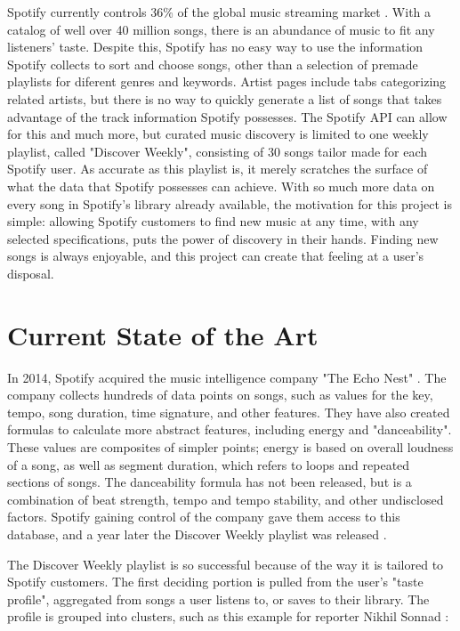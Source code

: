 Spotify currently controls 36\% of the global music streaming market \cite{Midia:18}. With a
catalog of well over 40 million songs, there is an abundance of music to fit
any listeners' taste. Despite this, Spotify has no easy way to use the information
Spotify collects to sort and choose songs, other than a selection of premade playlists
for diferent genres and keywords. Artist pages include tabs categorizing related artists,
but there is no way to quickly generate a list of songs that
takes advantage of the track information Spotify possesses. The Spotify
API can allow for this and much more, but curated music discovery is limited to one weekly
playlist, called "Discover Weekly", consisting of 30 songs tailor made for each
Spotify user. As accurate as this playlist is, it merely scratches the surface of
what the data that Spotify possesses can achieve. With so much more data on every
song in Spotify's library already available, the motivation for this project is
simple: allowing Spotify customers to find new music at any time, with any selected
specifications, puts the power of discovery in their hands. Finding new songs is
always enjoyable, and this project can create that feeling at a user's disposal.


\section{Current State of the Art}\label{sec:stateofart}

In 2014, Spotify acquired the music intelligence company "The Echo Nest" \cite{echo:14}.
The company collects hundreds of data points on songs, such as values for the key,
tempo, song duration, time signature, and other features. They have also created
formulas to calculate more abstract features, including energy and "danceability".
These values are composites of simpler points; energy is based on overall loudness
of a song, as well as segment duration, which refers to loops and repeated sections
of songs. The danceability formula has not been released, but is a combination of
beat strength, tempo and tempo stability, and other undisclosed factors. Spotify
gaining control of the company gave them access to this database, and a year later
the Discover Weekly playlist was released \cite{Constine:15}.

The Discover Weekly playlist is so successful because of the way it is tailored to
Spotify customers. The first deciding portion is pulled from the user's
"taste profile", aggregated from songs a user listens to, or saves to their library.
The profile is grouped into clusters, such as this example for reporter Nikhil Sonnad
\cite{Pasick:15}:

